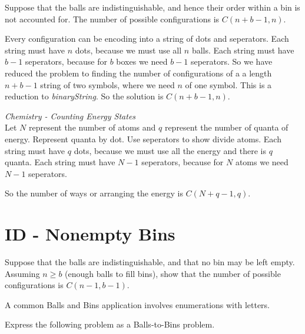 Suppose that the balls are indistinguishable, and hence their order within a bin 
is not accounted for. The number of possible configurations is $C(n+b-1, n)$.

Every configuration can be encoding into a string of dots and seperators. 
Each string must have $n$ dots, because we must use all $n$ balls. 
Each string must have $b-1$ seperators, because for $b$ boxes we need $b-1$ seperators.
So we have reduced the problem to finding the number of configurations of a
a length $n + b-1$ string of two symbols, where we need $n$ of one symbol. 
This is a reduction to \textit{binaryString}. So the solution is $C(n + b -1, n)$. 

\frmrule

\begin{example}

\end{example}

\frmrule

\begin{example}
\textit{Chemistry - Counting Energy States} \\
Let $N$ represent the number of atoms and $q$ represent the number of quanta of energy. 
Represent quanta by dot. Use seperators to show divide atoms.
Each string must have $q$ dots, because we must use all the energy and there is $q$ quanta. 
Each string must have $N-1$ seperators, because for $N$ atoms we need $N-1$ seperators.

So the number of ways or arranging the energy is $C(N + q - 1, q)$. 
\end{example}

\frmrule

\section{ID - Nonempty Bins}


Suppose that the balls are indistinguishable, and that no bin may be left empty. 
Assuming $n \geqslant b$ (enough balls to fill bins),
show that the number of possible configurations is $C(n-1, b-1)$.

\frmrule

A common Balls and Bins application involves enumerations with letters.

\frmrule

\begin{example}
Express the following problem as a Balls-to-Bins problem. 
\end{example}

